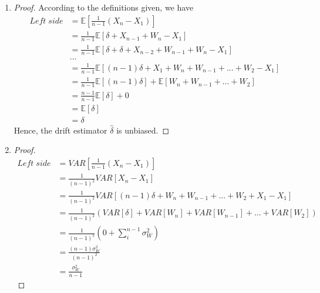 \documentclass[10pt]{article}
\begin{document}
\begin{enumerate}[1)]
\item
\begin{proof}
According to the definitions given, we have
\begin{align*}
Left\;side&=\mathbb{E}[\frac{1}{n-1}(X_n-X_1)]\\
&=\frac{1}{n-1}\mathbb{E}[\delta+X_{n-1}+W_n-X_1]\\
&=\frac{1}{n-1}\mathbb{E}[\delta+\delta+X_{n-2}+W_{n-1}+W_n-X_1]\\
&...\\
&=\frac{1}{n-1}\mathbb{E}[(n-1)\delta+X_1+W_n+W_{n-1}+...+W_2-X_1]\\
&=\frac{1}{n-1}\mathbb{E}[(n-1)\delta]+\mathbb{E}[W_n+W_{n-1}+...+W_2]\\
&=\frac{n-1}{n-1}\mathbb{E}[\delta]+0\\
&=\mathbb{E}[\delta]\\
&=\delta
\end{align*}
Hence, the drift estimator $\hat{\delta}$ is unbiased.
\end{proof}
\vspace{3mm}

\item
\begin{proof}
\begin{align*}
Left\;side&=VAR[\frac{1}{n-1}(X_n-X_1)]\\
&=\frac{1}{(n-1)^2}VAR[X_n-X_1]\\
&=\frac{1}{(n-1)^2}VAR[(n-1)\delta+W_n+W_{n-1}+...+W_2+X_1-X_1]\\
&=\frac{1}{(n-1)^2}(VAR[\delta]+VAR[W_n]+VAR[W_{n-1}]+...+VAR[W_2])\\ %
&=\frac{1}{(n-1)^2}(0+\sum_i^{n-1}\sigma^2_W)\\
&=\frac{(n-1)\sigma^2_W}{(n-1)^2}\\
&=\frac{\sigma^2_W}{n-1}
\end{align*}
\end{proof}

\end{enumerate}
\vspace{3mm}
\end{document}
